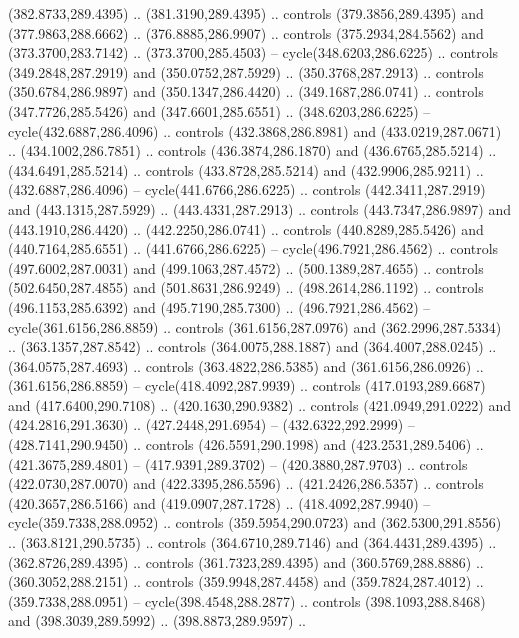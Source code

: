 \begin{scope}[cm={{1.25,0.0,0.0,-1.25,(0.0,743.43331)}}]
    (382.8733,289.4395) .. (381.3190,289.4395) .. controls (379.3856,289.4395) and
    (377.9863,288.6662) .. (376.8885,286.9907) .. controls (375.2934,284.5562) and
    (373.3700,283.7142) .. (373.3700,285.4503) -- cycle(348.6203,286.6225) ..
    controls (349.2848,287.2919) and (350.0752,287.5929) .. (350.3768,287.2913) ..
    controls (350.6784,286.9897) and (350.1347,286.4420) .. (349.1687,286.0741) ..
    controls (347.7726,285.5426) and (347.6601,285.6551) .. (348.6203,286.6225) --
    cycle(432.6887,286.4096) .. controls (432.3868,286.8981) and
    (433.0219,287.0671) .. (434.1002,286.7851) .. controls (436.3874,286.1870) and
    (436.6765,285.5214) .. (434.6491,285.5214) .. controls (433.8728,285.5214) and
    (432.9906,285.9211) .. (432.6887,286.4096) -- cycle(441.6766,286.6225) ..
    controls (442.3411,287.2919) and (443.1315,287.5929) .. (443.4331,287.2913) ..
    controls (443.7347,286.9897) and (443.1910,286.4420) .. (442.2250,286.0741) ..
    controls (440.8289,285.5426) and (440.7164,285.6551) .. (441.6766,286.6225) --
    cycle(496.7921,286.4562) .. controls (497.6002,287.0031) and
    (499.1063,287.4572) .. (500.1389,287.4655) .. controls (502.6450,287.4855) and
    (501.8631,286.9249) .. (498.2614,286.1192) .. controls (496.1153,285.6392) and
    (495.7190,285.7300) .. (496.7921,286.4562) -- cycle(361.6156,286.8859) ..
    controls (361.6156,287.0976) and (362.2996,287.5334) .. (363.1357,287.8542) ..
    controls (364.0075,288.1887) and (364.4007,288.0245) .. (364.0575,287.4693) ..
    controls (363.4822,286.5385) and (361.6156,286.0926) .. (361.6156,286.8859) --
    cycle(418.4092,287.9939) .. controls (417.0193,289.6687) and
    (417.6400,290.7108) .. (420.1630,290.9382) .. controls (421.0949,291.0222) and
    (424.2816,291.3630) .. (427.2448,291.6954) -- (432.6322,292.2999) --
    (428.7141,290.9450) .. controls (426.5591,290.1998) and (423.2531,289.5406) ..
    (421.3675,289.4801) -- (417.9391,289.3702) -- (420.3880,287.9703) .. controls
    (422.0730,287.0070) and (422.3395,286.5596) .. (421.2426,286.5357) .. controls
    (420.3657,286.5166) and (419.0907,287.1728) .. (418.4092,287.9940) --
    cycle(359.7338,288.0952) .. controls (359.5954,290.0723) and
    (362.5300,291.8556) .. (363.8121,290.5735) .. controls (364.6710,289.7146) and
    (364.4431,289.4395) .. (362.8726,289.4395) .. controls (361.7323,289.4395) and
    (360.5769,288.8886) .. (360.3052,288.2151) .. controls (359.9948,287.4458) and
    (359.7824,287.4012) .. (359.7338,288.0951) -- cycle(398.4548,288.2877) ..
    controls (398.1093,288.8468) and (398.3039,289.5992) .. (398.8873,289.9597) ..

\end{scope}

